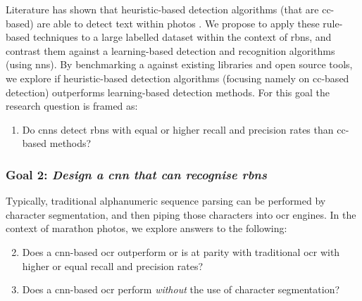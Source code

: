 Literature has shown that heuristic-based detection algorithms (that are \gls{cc}-based) are able to detect text within photos \citep{Li:2012wd, Chen:2011ul, Eichner:2008dw}. We propose to apply these rule-based techniques to a large labelled dataset within the context of \glspl{rbn}, and contrast them against a learning-based detection and recognition algorithms (using \glspl{nn}). By benchmarking a against existing libraries and open source tools, we explore if heuristic-based detection algorithms (focusing namely on \gls{cc}-based detection) outperforms learning-based detection methods.
For this goal the research question is framed as:
\begin{enumerate}[label=\bfseries~RQ\arabic*), leftmargin=2cm, rightmargin=1.5cm]
  \item\label{rq:1} Do \glspl{cnn} detect \glspl{rbn} with equal or higher recall and precision rates than \gls{cc}-based methods?
\end{enumerate}

\subsubsection*{Goal 2: \itshape Design a \gls{cnn} that can recognise \glspl{rbn}}

Typically, traditional alphanumeric sequence parsing can be performed by character segmentation, and then piping those characters into \gls{ocr} engines.
In the context of marathon photos, we explore answers to the following:
\begin{enumerate}[label=\bfseries~RQ\arabic*), leftmargin=2cm, rightmargin=1.5cm]
  \setcounter{enumi}{1}
  \item\label{rq:2} Does a \gls{cnn}-based \gls{ocr} outperform or is at parity with traditional \gls{ocr} with higher or equal recall and precision rates?
  \item\label{rq:3} Does a \gls{cnn}-based \gls{ocr} perform \textit{without} the use of character segmentation?
\end{enumerate}

